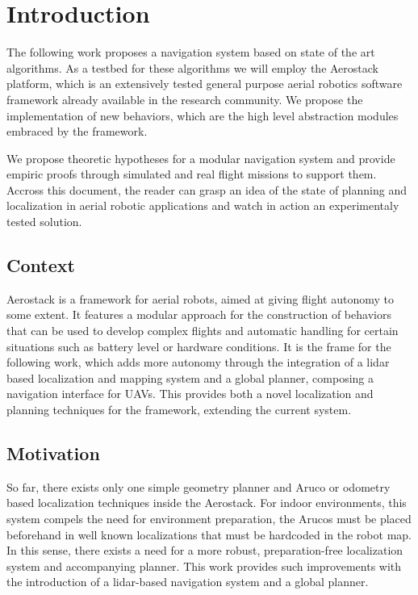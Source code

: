 \chapter{Introduction}

  The following work proposes a navigation system based on state of the art algorithms. As a testbed for these algorithms we will employ the Aerostack platform, which is an extensively tested general purpose aerial robotics software framework already available in the research community. We propose the implementation of new behaviors, which are the high level abstraction modules embraced by the framework.

  We propose theoretic hypotheses for a modular navigation system and provide empiric proofs through simulated and real flight missions to support them. Accross this document, the reader can grasp an idea of the state of planning and localization in aerial robotic applications and watch in action an experimentaly tested solution.

  \section{Context}

    Aerostack is a framework for aerial robots, aimed at giving flight autonomy to some extent. It features a modular approach for the construction of behaviors that can be used to develop complex flights and automatic handling for certain situations such as battery level or hardware conditions. It is the frame for the following work, which adds more autonomy through the integration of a lidar based localization and mapping system and a global planner, composing a navigation interface for UAVs. This provides both a novel localization and planning techniques for the framework, extending the current system.

  \section{Motivation}

    So far, there exists only one simple geometry planner and Aruco or odometry based localization techniques inside the Aerostack. For indoor environments, this system compels the need for environment preparation, the Arucos must be placed beforehand in well known localizations that must be hardcoded in the robot map. In this sense, there exists a need for a more robust, preparation-free localization system and accompanying planner. This work provides such improvements with the introduction of a lidar-based navigation system and a global planner.

